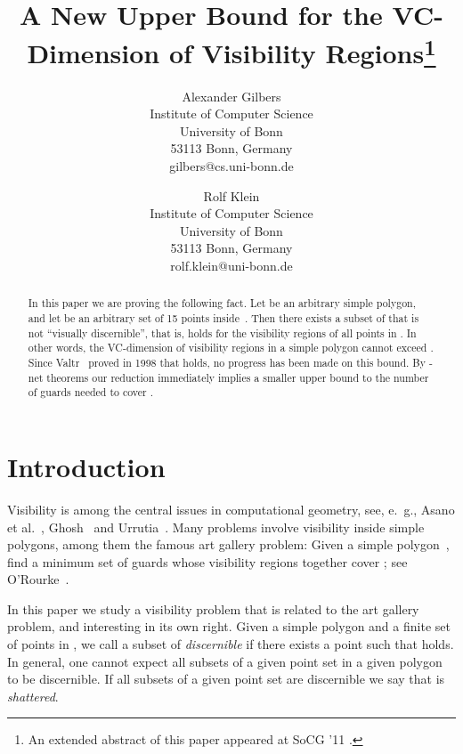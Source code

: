 \documentclass[11pt]{article}
\begin{document}
\title{A New Upper Bound for the VC-Dimension of Visibility Regions\footnote{An extended abstract of this paper appeared at SoCG '11 \cite{gk-nubvcvr-11}.}}


\author{Alexander Gilbers\\
Institute of Computer Science\\
          University of Bonn\\
           53113 Bonn, Germany \\
           gilbers@cs.uni-bonn.de
       \and Rolf Klein\\
       Institute of Computer Science\\
          University of Bonn\\
           53113 Bonn, Germany \\
           rolf.klein@uni-bonn.de
       }

\maketitle

\begin{abstract}
In this paper we are proving the following fact.
Let  be an arbitrary simple polygon, and let  be an arbitrary set of 15 points inside~.
Then there exists a subset  of  that is not ``visually discernible'', that is, 
 holds for the visibility regions  of all points  in .
In other words, the VC-dimension   of visibility regions in a simple polygon cannot exceed .
Since Valtr~\cite{v-ggwps-98} proved in 1998 that  holds, 
no progress has been made on this bound.
By -net theorems our reduction immediately implies a smaller upper bound to the number of guards
needed to cover .
\end{abstract}






\section{Introduction}  

Visibility is among the central issues in computational geometry, see, e.~g., 
Asano et al.~\cite{ags-vip-00}, Ghosh~\cite{g-vap-07} and Urrutia~\cite{u-agip-00}.
Many problems involve visibility inside simple polygons,
among them the famous art gallery problem: Given a simple polygon~, find a minimum set of 
guards whose visibility regions together cover ; see O'Rourke~\cite{r-agta-87}. 

In this paper we study a visibility problem that is related to the art gallery problem, and interesting
in its own right. Given a simple polygon  and a finite set  of points in , we call a subset 
of  {\em  discernible} if there exists a point  such that  holds.
In general, one cannot expect all subsets of a given point set in a given polygon to be discernible.
If all subsets of a given point set  are discernible we say that  is \textit{shattered}.
\end{document}
